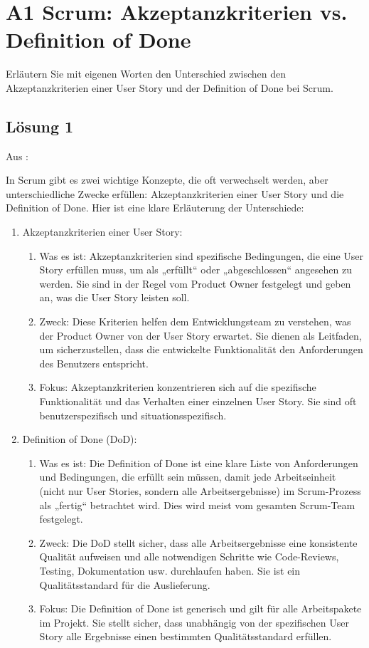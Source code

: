 \documentclass[main.tex]{subfiles}
\begin{document}
\section{A1 Scrum: Akzeptanzkriterien vs. Definition of Done}
Erläutern Sie mit eigenen Worten den Unterschied zwischen den Akzeptanzkriterien einer User Story und der Definition of Done bei Scrum.

\subsection{Lösung 1}

Aus \cite{openai2023chatgpt4}:

In Scrum gibt es zwei wichtige Konzepte, die oft verwechselt werden, aber unterschiedliche Zwecke erfüllen: Akzeptanzkriterien einer User Story und die Definition of Done. Hier ist eine klare Erläuterung der Unterschiede:


\renewcommand{\labelenumi}{\arabic{enumi}.}
\begin{enumerate}

\item Akzeptanzkriterien einer User Story:
\begin{enumerate}
   \item Was es ist: Akzeptanzkriterien sind spezifische Bedingungen, die eine User Story erfüllen muss, um als „erfüllt“ oder „abgeschlossen“ angesehen zu werden. Sie sind in der Regel vom Product Owner festgelegt und geben an, was die User Story leisten soll.
   \item Zweck: Diese Kriterien helfen dem Entwicklungsteam zu verstehen, was der Product Owner von der User Story erwartet. Sie dienen als Leitfaden, um sicherzustellen, dass die entwickelte Funktionalität den Anforderungen des Benutzers entspricht.
   \item Fokus: Akzeptanzkriterien konzentrieren sich auf die spezifische Funktionalität und das Verhalten einer einzelnen User Story. Sie sind oft benutzerspezifisch und situationsspezifisch.
\end{enumerate}
\item Definition of Done (DoD):
\begin{enumerate}
    \item Was es ist: Die Definition of Done ist eine klare Liste von Anforderungen und Bedingungen, die erfüllt sein müssen, damit jede Arbeitseinheit (nicht nur User Stories, sondern alle Arbeitsergebnisse) im Scrum-Prozess als „fertig“ betrachtet wird. Dies wird meist vom gesamten Scrum-Team festgelegt.
    \item Zweck: Die DoD stellt sicher, dass alle Arbeitsergebnisse eine konsistente Qualität aufweisen und alle notwendigen Schritte wie Code-Reviews, Testing, Dokumentation usw. durchlaufen haben. Sie ist ein Qualitätsstandard für die Auslieferung.
    \item Fokus: Die Definition of Done ist generisch und gilt für alle Arbeitspakete im Projekt. Sie stellt sicher, dass unabhängig von der spezifischen User Story alle Ergebnisse einen bestimmten Qualitätsstandard erfüllen.
\end{enumerate}
\end{enumerate}
\end{document}
